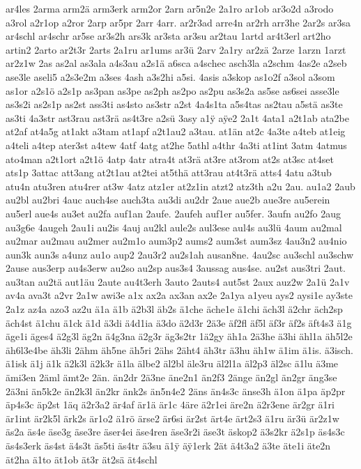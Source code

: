 {ar4les
2arma
arm2ä
arm3erk
arm2or
2arn
ar5n2e
2a1ro
ar1ob
ar3o2d
a3rodo
a3rol
a2r1op
a2ror
2arp
ar5pr
2arr
4arr.
ar2r3ad
arre4n
ar2rh
arr3he
2ar2s
ar3sa
ar4schl
ar4schr
ar5se
ar3s2h
ars3k
ar3sta
ar3su
ar2tau
1artd
ar4t3erl
art2ho
artin2
2arto
ar2t3r
2arts
2a1ru
ar1ums
ar3ü
2arv
2a1ry
ar2zä
2arze
1arzn
1arzt
ar2z1w
2as
as2al
as3ala
a4s3au
a2s1ä
a6sca
a4schec
asch3la
a2schm
4as2e
a2seb
ase3le
aseli5
a2s3e2m
a3ses
4ash
a3s2hi
a5si.
4asis
a3skop
as1o2f
a3sol
a3som
as1or
a2s1ö
a2s1p
as3pan
as3pe
as2ph
as2po
as2pu
as3s2a
as5se
as6sei
asse3le
as3s2i
as2s1p
as2st
ass3ti
as4sto
as3str
a2st
4a4s1ta
a5s4tas
as2tau
a5stä
as3te
as3ti
4a3str
ast3rau
ast3rä
as4t3re
a2sü
3asy
a1^^ff
a^^ffe2
2a1t
4ata1
a2t1ab
ata2be
at2af
at4a5g
at1akt
a3tam
at1apf
a2t1au2
a3tau.
at1än
at2c
4a3te
a4teb
at1eig
a4teli
a4tep
ater3st
a4tew
4atf
4atg
at2he
5athl
a4thr
4a3ti
at1int
3atm
4atmus
ato4man
a2t1ort
a2t1ö
4atp
4atr
atra4t
at3rä
at3re
at3rom
at2s
at3sc
at4set
ats1p
3attac
att3ang
at2t1au
at2tei
at5thä
att3rau
at4t3rä
atts4
4atu
a3tub
atu4n
atu3ren
atu4rer
at3w
4atz
atz1er
at2z1in
atzt2
atz3th
a2u
2au.
au1a2
2aub
au2bl
au2bri
4auc
auch4se
auch3ta
au3di
au2dr
2aue
aue2b
aue3re
au5erein
au5erl
aue4s
au3et
au2fa
auf1an
2aufe.
2aufeh
auf1er
au5fer.
3aufn
au2fo
2aug
au3g6e
4augeh
2au1i
au2is
4auj
au2kl
aule2s
aul3ese
aul4s
au3lü
4aum
au2mal
au2mar
au2mau
au2mer
au2m1o
aum3p2
aums2
aum3st
aum3sz
4au3n2
au4nio
aun3k
aun3s
a4unz
au1o
aup2
2au3r2
au2s1ah
ausan8ne.
4au2sc
au3schl
au3schw
2ause
aus3erp
au4s3erw
au2so
au2sp
aus3s4
3aussag
aus4se.
au2st
aus3tri
2aut.
au3tan
au2tä
aut1äu
2aute
au4t3erh
3auto
2auts4
aut5st
2aux
auz2w
2a1ü
2a1v
av4a
ava3t
a2vr
2a1w
awi3e
a1x
ax2a
ax3an
ax2e
2a1ya
a1yeu
ays2
aysi1e
ay3ste
2a1z
az4a
azo3
az2u
ä1a
ä1b
ä2b3l
äb2s
ä1che
äche1e
ä1chi
äch3l
ä2chr
äch2sp
äch4st
ä1chu
ä1ck
ä1d
ä3di
ä4d1ia
ä3do
ä2d3r
2ä3e
äf2fl
äf5l
äf3r
äf2s
äft4s3
ä1g
äge1i
äges4
ä2g3l
äg2n
ä4g3na
ä2g3r
äg3s2tr
1ä2gy
äh1a
2ä3he
ä3hi
ähl1a
äh5l2e
äh6l3e4be
äh3li
2ähm
äh5ne
äh5ri
2ähs
2äht4
äh3tr
ä3hu
äh1w
ä1im
ä1is.
ä3isch.
ä1isk
ä1j
ä1k
ä2k3l
ä2k3r
ä1la
älbe2
äl2bl
äle3ru
äl2l1a
äl2p3
äl2sc
ä1lu
ä3me
ämi3en
2äml
ämt2e
2än.
än2dr
2ä3ne
äne2n1
än2f3
2änge
än2gl
än2gr
äng3se
2ä3ni
än5k2e
än2k3l
än2kr
änk2s
än5n4e2
2äns
än4s3c
änse3h
ä1on
ä1pa
äp2pr
äp4s3c
äp2st
1äq
ä2r3a2
är4af
är1ä
är1c
4äre
ä2r1ei
äre2n
ä2r3ene
är2gr
ä1ri
är1int
är2k5l
ärk2s
är1o2
ä1rö
ärse2
är6si
är2st
ärt4e
ärt2s3
ä1ru
är3ü
är2z1w
äs2a
äs4e
äse3g
äse3re
äser4ei
äse4ren
äse3r2i
äse3t
äskop2
ä3s2kr
ä2s1p
äs4s3c
äs4s3erk
äs4st
ä4s3t
äs5ti
äs4tr
ä3su
ä1^^ff
ä^^ff1erk
2ät
ä4t3a2
ä3te
äte1i
äte2n
ät2ha
ä1to
ät1ob
ät3r
ät2sä
ät4schl
}
